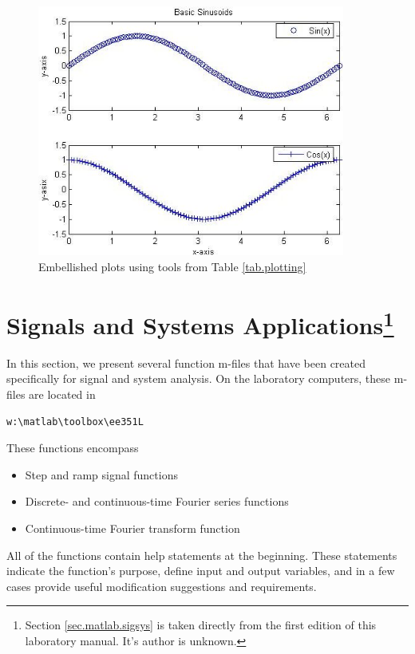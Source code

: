 \begin{figure}[hbp!]
\centering
\includegraphics[width=0.9\textwidth]{fancyplot}
\caption{\footnotesize
        Embellished plots using tools from Table \ref{tab.plotting}
        \label{fig.matlab.fancyplot}
        }
\end{figure}

\section[Signals and Systems Applications]{Signals and Systems Applications\footnote{Section \ref{sec.matlab.sigsys} is taken directly from the first edition of this laboratory manual.  It's author is unknown.} \label{sec.matlab.sigsys}
}
In this section, we present several function m-files that have been created specifically for signal and system analysis.  On the laboratory com\-puters, these m-files are loc\-ated in
\begin{verbatim}
w:\matlab\toolbox\ee351L
\end{verbatim}
These functions encompass
\begin{itemize}
    \item Step and ramp signal functions
    \item Discrete- and continuous-time Fourier series functions
    \item Continuous-time Fourier transform function
\end{itemize}
All of the functions contain help statements at the beginning.  These statements indicate the function's purpose, define input and output variables, and in a  few cases provide useful modification suggestions and requirements.

